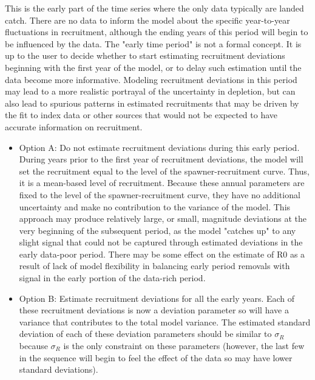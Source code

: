 This is the early part of the time series where the only data typically are landed catch. There are no data to inform the model about the specific year-to-year fluctuations in recruitment, although the ending years of this period will begin to be influenced by the data.  The "early time period" is not a formal concept. It is up to the user to decide whether to start estimating recruitment deviations beginning with the first year of the model, or to delay such estimation until the data become more informative. Modeling recruitment deviations in this period may lead to a more realistic portrayal of the uncertainty in depletion, but can also lead to spurious patterns in estimated recruitments that may be driven by the fit to index data or other sources that would not be expected to have accurate information on recruitment.
	\begin{itemize}
		\item Option A: Do not estimate recruitment deviations during this early period.  During years prior to the first year of recruitment deviations, the model will set the recruitment equal to the level of the spawner-recruitment curve.  Thus, it is a mean-based level of recruitment.  Because these annual parameters are fixed to the level of the spawner-recruitment curve, they have no additional uncertainty and make no contribution to the variance of the model. This approach may produce relatively large, or small, magnitude deviations at the very beginning of the subsequent period, as the model "catches up" to any slight signal that could not be captured through estimated deviations in the early data-poor period.  There may be some effect on the estimate of R0 as a result of lack of model flexibility in balancing early period removals with signal in the early portion of the data-rich period.  
		\item Option B: Estimate recruitment deviations for all the early years. Each of these recruitment deviations is now a deviation parameter so will have a variance that contributes to the total model variance. The estimated standard deviation of each of these deviation parameters should be similar to $\sigma_R$ because $\sigma_R$ is the only constraint on these parameters (however, the last few in the sequence will begin to feel the effect of the data so may have lower standard deviations). 		
	\end{itemize}
	

